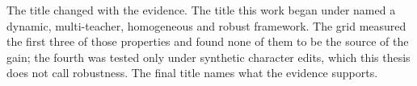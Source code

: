 The title changed with the evidence. The title this work began under named a dynamic, multi-teacher,
homogeneous and robust framework. The grid measured the first three of those properties and found none of them to
be the source of the gain; the fourth was tested only under synthetic character edits, which this
thesis does not call robustness. The final title names what the evidence supports.
